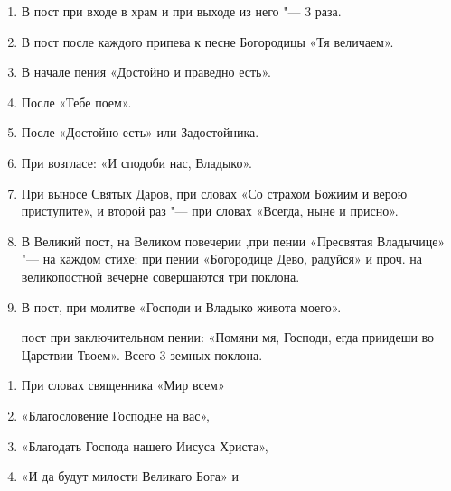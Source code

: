 \begin{mymulticols}
\begin{enumerate}
\end{enumerate}


\begin{enumerate}
\item В пост при входе в храм и при выходе из него "--- 3 раза. 

\item В пост после каждого припева к песне Богородицы «Тя величаем». 

\item В начале пения «Достойно и праведно есть». 

\item После «Тебе поем». 

\item После «Достойно есть» или Задостойника. 

\item При возгласе: «И сподоби нас, Владыко». 

\item При выносе Святых Даров, при словах «Со страхом Божиим и верою приступите», и второй раз "--- при словах «Всегда, ныне и присно». 

\item В Великий пост, на Великом повечерии ,при пении «Пресвятая Владычице» "--- на каждом стихе; при пении «Богородице Дево, радуйся» и проч. на великопостной вечерне совершаются три поклона. 

\item В пост, при молитве «Господи и Владыко живота моего». 

 пост при заключительном пении: «Помяни мя, Господи, егда приидеши во Царствии Твоем». Всего 3 земных поклона.

\end{enumerate}





\begin{enumerate}

\item При словах священника «Мир всем»

\item «Благословение Господне на вас»,

\item «Благодать Господа нашего Иисуса Христа», 

\item «И да будут милости Великаго Бога» и


\end{enumerate}
\end{mymulticols}
